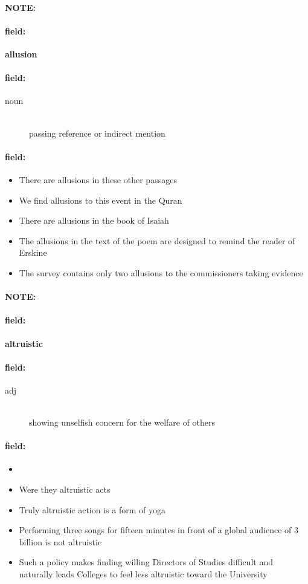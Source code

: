 \documentclass[12pt]{article}
\newenvironment{note}{\paragraph{NOTE:}}{}
\newenvironment{field}{\paragraph{field:}}{}
\begin{document}
\begin{note}
\begin{field}
\textbf{\large allusion}
\end{field}


\begin{field}
\begin{description}
\item[noun] \hfill \\ 
passing reference or indirect mention

\end{description}
\end{field}

\begin{field}
\begin{itemize}
\item There are allusions in these other passages
\item We find allusions to this event in the Quran
\item There are allusions in the book of Isaiah
\item The allusions in the text of the poem are designed to remind the reader of Erskine
\item The survey contains only two allusions to the commissioners taking evidence
\end{itemize}
\end{field}
\end{note}
\begin{note}
\begin{field}
\textbf{\large altruistic}
\end{field}


\begin{field}
\begin{description}
\item[adj] \hfill \\ 
showing unselfish concern for the welfare of others

\end{description}
\end{field}

\begin{field}
\begin{itemize}
\item 
\item Were they altruistic acts
\item Truly altruistic action is a form of yoga
\item Performing three songs for fifteen minutes in front of a global audience of 3 billion is not altruistic
\item Such a policy makes finding willing Directors of Studies difficult and naturally leads Colleges to feel less altruistic toward the University
\end{itemize}
\end{field}
\end{note}
\end{document}
